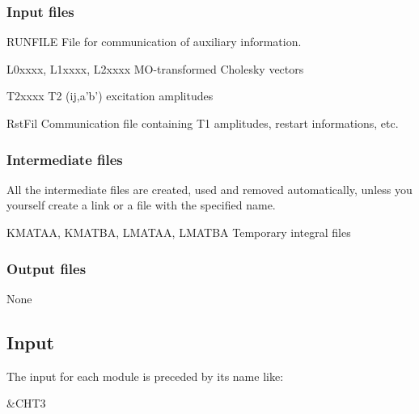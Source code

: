 \subsubsection{Input files}

\begin{filelist}
\item[RUNFILE]
File for communication of auxiliary information.
\item[L0xxxx, L1xxxx, L2xxxx]
MO-transformed Cholesky vectors
\item[T2xxxx]
T2 (ij,a'b') excitation amplitudes
\item[RstFil]
Communication file containing T1 amplitudes, restart informations, etc.
\end{filelist}

\subsubsection{Intermediate files}

All the intermediate files are created, used and removed
automatically, unless you yourself create a link or a file
with the specified name.

\begin{filelist}
\item[KMATAA, KMATBA, LMATAA, LMATBA]
Temporary integral files
\end{filelist}
\subsubsection{Output files}

\begin{filelist}
\item[None]
\end{filelist}

\subsection{Input}
\label{sec:cct3_input}

The input for each module is preceded by its name like:
\begin{inputlisting}
 &CHT3
\end{inputlisting}

